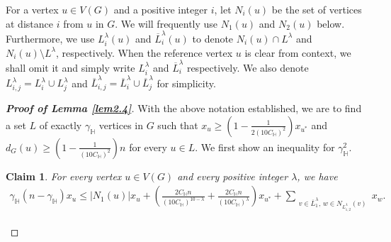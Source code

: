 \documentclass[11pt, a4paper]{article}
\newtheorem{claim}[theorem]{Claim}
\theoremstyle{definition}
\newcommand{\<}{\subseteq}
\begin{document}
For a vertex $u\in V(G)$ and a positive integer $i$, let $N_i(u)$ be the set of vertices at distance $i$ from $u$ in $G$.
We will frequently use $N_1(u)$ and $N_2(u)$ below.
Furthermore, we use $L_i^\lambda(u)$ and $\overline{L}_i^\lambda(u)$ to denote $N_i(u)\cap L^\lambda$ and $N_i(u)\setminus L^\lambda$, respectively.
When the reference vertex $u$  is clear from context, we shall omit it and simply write $L_i^\lambda$ and $\overline{L}_i^\lambda$ respectively. 
We also denote $L_{i,j}^\lambda=L_i^\lambda \cup L_j^\lambda$ and $\overline{L}_{i,j}^\lambda=\overline{L}_i^\lambda \cup \overline{L}_j^\lambda$ for simplicity.

\begin{proof}[\bf Proof of Lemma \ref{lem2.4}]
With the above notation established, we are to find a set $L$ of exactly $\gamma_\mathbb{H}$ vertices in $G$ such that $x_{u} \geq (1-\frac{1}{2(10C_\mathbb{H})^{2}})x_{u^{*}}$ and $d_{G}(u) \geq (1-\frac{1}{(10C_\mathbb{H})^{2}})n$ for every $u \in L$. We first show an inequality for $\gamma_{\mathbb{H}}^2$. 


\begin{claim}\label{lem4.2}
    For every vertex \( u \in V(G) \) and every positive integer \( \lambda \), we have 
    \begin{align}\label{eq:5}
        \gamma_\mathbb{H}(n-\gamma_\mathbb{H})x_u \leq |N_1(u)|x_u + \left( \frac{2C_\mathbb{H}n}{(10C_\mathbb{H})^{10-\lambda}} + \frac{2C_\mathbb{H}n}{(10C_\mathbb{H})^\lambda} \right)x_{u^*} + \sum_{\substack{v \in \overline{L}_1^\lambda,\,w \in N_{L_{1,2}^\lambda}(v)}} x_w.
    \end{align}
\end{claim}


\end{proof}
\end{document}

